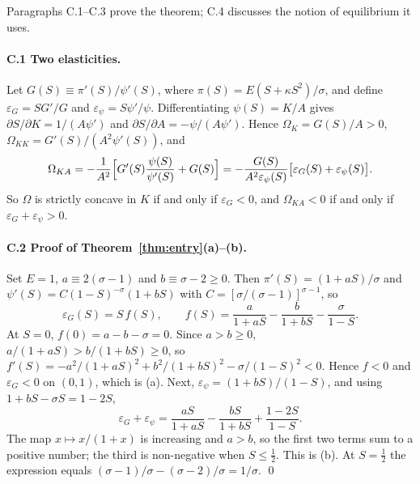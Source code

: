 \documentclass[11pt]{article}
\begin{document}
\noindent Paragraphs C.1--C.3 prove the theorem; C.4 discusses the notion of
equilibrium it uses.

\paragraph{C.1 Two elasticities.} Let $G(S)\equiv\pi'(S)/\psi'(S)$, where
$\pi(S)=E(S+\kappa S^2)/\sigma$, and define $\varepsilon_G=SG'/G$ and
$\varepsilon_\psi=S\psi'/\psi$. Differentiating $\psi(S)=K/A$ gives
$\partial S/\partial K=1/(A\psi')$ and $\partial S/\partial A=-\psi/(A\psi')$. Hence
$\Omega_K=G(S)/A>0$, $\Omega_{KK}=G'(S)/(A^2\psi'(S))$, and
\[
  \Omega_{KA}=-\frac{1}{A^2}\Bigl[G'(S)\frac{\psi(S)}{\psi'(S)}+G(S)\Bigr]
  =-\frac{G(S)}{A^2\varepsilon_\psi(S)}\bigl[\varepsilon_G(S)+\varepsilon_\psi(S)\bigr].
\]
So $\Omega$ is strictly concave in $K$ if and only if $\varepsilon_G<0$, and
$\Omega_{KA}<0$ if and only if $\varepsilon_G+\varepsilon_\psi>0$.

\paragraph{C.2 Proof of Theorem~\ref{thm:entry}(a)--(b).} Set $E=1$,
$a\equiv2(\sigma-1)$ and $b\equiv\sigma-2\ge0$. Then $\pi'(S)=(1+aS)/\sigma$ and
$\psi'(S)=C(1-S)^{-\sigma}(1+bS)$ with $C=[\sigma/(\sigma-1)]^{\sigma-1}$, so
\[
  \varepsilon_G(S)=S\,f(S),\qquad
  f(S)=\frac{a}{1+aS}-\frac{b}{1+bS}-\frac{\sigma}{1-S}.
\]
At $S=0$, $f(0)=a-b-\sigma=0$. Since $a>b\ge0$, $a/(1+aS)>b/(1+bS)\ge0$, so
$f'(S)=-a^2/(1+aS)^2+b^2/(1+bS)^2-\sigma/(1-S)^2<0$. Hence $f<0$ and $\varepsilon_G<0$ on
$(0,1)$, which is (a). Next, $\varepsilon_\psi=(1+bS)/(1-S)$, and using
$1+bS-\sigma S=1-2S$,
\[
  \varepsilon_G+\varepsilon_\psi=\frac{aS}{1+aS}-\frac{bS}{1+bS}+\frac{1-2S}{1-S}.
\]
The map $x\mapsto x/(1+x)$ is increasing and $a>b$, so the first two terms sum to a
positive number; the third is non-negative when $S\le\frac12$. This is (b). At
$S=\frac12$ the expression equals $(\sigma-1)/\sigma-(\sigma-2)/\sigma=1/\sigma$. \qed
\end{document}
